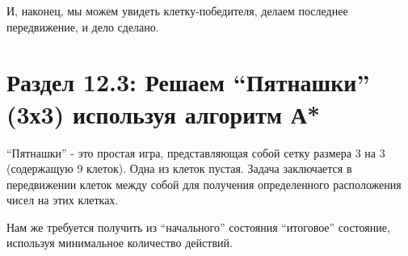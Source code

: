 

И, наконец, мы можем увидеть клетку-победителя, делаем последнее передвижение, и дело сделано.

\vspace{\baselineskip}
\section*{Раздел 12.3: Решаем “Пятнашки” (3х3) используя алгоритм А*}


“Пятнашки” - это простая игра, представляющая собой сетку размера 3 на 3 (содержащую 9 клеток). Одна из клеток пустая. Задача заключается в передвижении  клеток между собой для получения определенного расположения чисел на этих клетках.

\begin{comment} %
\textcolor{DarkOrchid}{Решаем “Пятнашки” (3х3) используя алгоритм А*}\\
\textcolor{Fuchsia}{Решаем “Пятнашки” (3х3) используя алгоритм А*}\\
\textcolor{Mulberry}{Решаем “Пятнашки” (3х3) используя алгоритм А*}\\
\textcolor{Orchid}{Решаем “Пятнашки” (3х3) используя алгоритм А*}\\
\textcolor{Plum}{Решаем “Пятнашки” (3х3) используя алгоритм А*}\\
\textcolor{RedViolet}{Решаем “Пятнашки” (3х3) используя алгоритм А*}\\
\textcolor{Purple}{Решаем “Пятнашки” (3х3) используя алгоритм А*}\\
\end{comment}


Нам же требуется получить из “начального” состояния “итоговое” состояние, используя минимальное количество действий.\\

\vspace{3mm}

\begin{tcolorbox}
\color{Purple}{
\_ 1 \ 3 
	
4 \ 2 \ 5
	
7 \ 8 \ 6}    
\end{tcolorbox}


